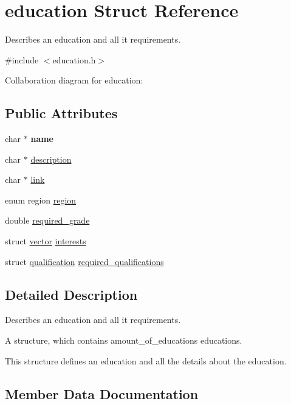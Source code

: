 \hypertarget{structeducation}{}\section{education Struct Reference}
\label{structeducation}


Describes an education and all it requirements.  




{\ttfamily \#include $<$education.\+h$>$}



Collaboration diagram for education\+:
\subsection*{Public Attributes}
\begin{DoxyCompactItemize}
\item 
\mbox{\label{structeducation_a67016708488af9826f66da80b2702e09}} 
char $\ast$ {\bfseries name}
\item 
char $\ast$ \hyperlink{structeducation_a24cdb1b8c614b0104b55dbfb57a12979}{description}
\item 
char $\ast$ \hyperlink{structeducation_a0244d20a4b1f00a6088cece10b77a0f3}{link}
\item 
enum region \hyperlink{structeducation_afbd04b27ec3401b2076f1a2806a4bd42}{region}
\item 
double \hyperlink{structeducation_ab0bb73fcbd8c30cb1be9f01f7fa608cd}{required\+\_\+grade}
\item 
struct \hyperlink{structvector}{vector} \hyperlink{structeducation_ae8ea10524118581a9ed1a93bafc5cc54}{interests}
\item 
struct \hyperlink{structqualification}{qualification} \hyperlink{structeducation_a0e95ac75d550a79ae7e10e915adb59ac}{required\+\_\+qualifications}
\end{DoxyCompactItemize}


\subsection{Detailed Description}
Describes an education and all it requirements. 

A structure, which contains amount\+\_\+of\+\_\+educations educations.

This structure defines an education and all the details about the education. 

\subsection{Member Data Documentation}
\mbox{\label{structeducation_a24cdb1b8c614b0104b55dbfb57a12979}} 
